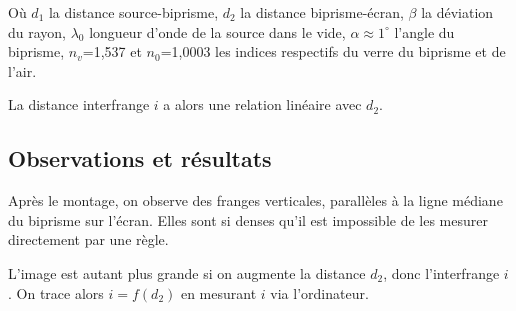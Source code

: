\documentclass[11pt, a4paper]{article}
\begin{document}
Où $d_1$ la distance source-biprisme, $d_2$ la distance biprisme-écran, $\beta$ la déviation du rayon, $\lambda_0$ longueur d'onde de la source dans le vide, $\alpha\approx1^{\circ}$ l'angle du biprisme, $n_v$=1,537 et $n_0$=1,0003 les indices respectifs du verre du biprisme et de l'air.

La distance interfrange $i$ a alors une relation linéaire avec $d_2$.
\subsection{Observations et résultats}
Après le montage, on observe des franges verticales, parallèles à la ligne médiane du biprisme sur l'écran. Elles sont si denses qu'il est impossible de les mesurer directement par une règle.

L'image est autant plus grande si on augmente la distance $d_2$, donc l'interfrange $i$. On trace alors $i=f(d_2)$ en mesurant $i$ via l'ordinateur.
\end{document}
